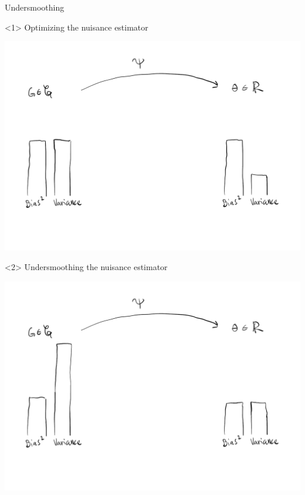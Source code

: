 \documentclass[smaller]{beamer}\usepackage{listings}
\begin{document}
\begin{frame}[label={sec:org9505974}]{Undersmoothing}
\begin{onlyenv}<1>
\center Optimizing the nuisance estimator
\begin{center}
\includegraphics[width=1\textwidth]{./Undersmooth-tradeoff1.pdf}
\end{center}
\end{onlyenv}

\begin{onlyenv}<2>
\center Undersmoothing the nuisance estimator
\begin{center}
\includegraphics[width=1\textwidth]{./Undersmooth-tradeoff2.pdf}
\end{center}
\end{onlyenv}
\end{frame}
\end{document}
